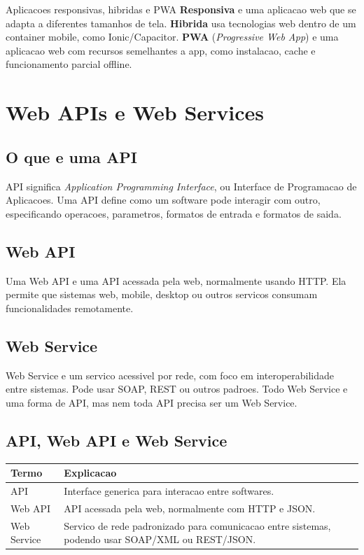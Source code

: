 \documentclass[12pt,a4paper]{article}
\begin{document}
\begin{conceito}{Aplicacoes responsivas, hibridas e PWA}
\textbf{Responsiva} e uma aplicacao web que se adapta a diferentes tamanhos de tela. \textbf{Hibrida} usa tecnologias web dentro de um container mobile, como Ionic/Capacitor. \textbf{PWA} (\textit{Progressive Web App}) e uma aplicacao web com recursos semelhantes a app, como instalacao, cache e funcionamento parcial offline.
\end{conceito}

\section{Web APIs e Web Services}

\subsection{O que e uma API}

API significa \textit{Application Programming Interface}, ou Interface de Programacao de Aplicacoes. Uma API define como um software pode interagir com outro, especificando operacoes, parametros, formatos de entrada e formatos de saida.

\subsection{Web API}

Uma Web API e uma API acessada pela web, normalmente usando HTTP. Ela permite que sistemas web, mobile, desktop ou outros servicos consumam funcionalidades remotamente.

\subsection{Web Service}

Web Service e um servico acessivel por rede, com foco em interoperabilidade entre sistemas. Pode usar SOAP, REST ou outros padroes. Todo Web Service e uma forma de API, mas nem toda API precisa ser um Web Service.

\subsection{API, Web API e Web Service}

\begin{tabularx}{\textwidth}{@{}L{3.2cm}Y@{}}
\toprule
\textbf{Termo} & \textbf{Explicacao} \\
\midrule
API & Interface generica para interacao entre softwares. \\
Web API & API acessada pela web, normalmente com HTTP e JSON. \\
Web Service & Servico de rede padronizado para comunicacao entre sistemas, podendo usar SOAP/XML ou REST/JSON. \\
\bottomrule
\end{tabularx}
\end{document}

